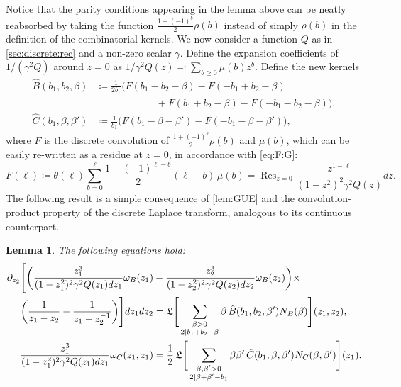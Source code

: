 \documentclass[a4paper,11pt,english]{article}
\theoremstyle{plain}
\newtheorem{lemma}[theorem]{Lemma}
\theoremstyle{definition}
\theoremstyle{plain}
\newcommand{\de}{\partial}
\DeclareMathOperator*{\Res}{Res}
\begin{document}
Notice that the parity conditions appearing in the lemma above can be neatly reabsorbed by taking the function $\frac{1+(-1)^{b}}{2} \rho(b)$ instead of simply $\rho(b)$ in the definition of the combinatorial kernels. We now consider a function $Q$ as in \cref{sec:discrete:rec} and a non-zero scalar $\gamma$. Define the expansion coefficients of $1/(\gamma^2 Q)$ around $z = 0$ as $1/\gamma^2 Q(z) \eqqcolon \sum_{b \ge 0} \mu(b) z^b$. Define the new kernels
\begin{equation}
\begin{split}
	\hat{B}(b_1,b_2,\beta)
	&\coloneqq
    \frac{1}{2b_1}
	\bigl(
		F(b_1 - b_2 - \beta) - F(-b_1 + b_2 - \beta) \\
		&\qquad\qquad\qquad
		+ F(b_1 + b_2 - \beta) - F(-b_1 -b_2 - \beta)
	\bigr), \\
	\hat{C}(b_1,\beta,\beta')
	&\coloneqq
    \frac{1}{b_1}
	\bigl(
		F(b_1 - \beta - \beta') - F(-b_1 - \beta - \beta')
	\bigr),
\end{split}
\end{equation}
where $F$ is the discrete convolution of $\frac{1+(-1)^{b}}{2} \rho(b)$ and $\mu(b)$, which can be easily re-written as a residue at $z = 0$, in accordance with \cref{eq:F:G}:
\begin{equation}
	F(\ell)
	\coloneqq
    \theta(\ell)
	\sum_{b = 0}^{\ell} \frac{1 + (-1)^{\ell - b}}{2} (\ell - b) \, \mu(b)
    =
    \Res_{z = 0} \frac{z^{1-\ell}}{(1 - z^2)^2 \gamma^2 Q(z)} dz.
\end{equation}
The following result is a simple consequence of \cref{lem:GUE} and the convolution-product property of the discrete Laplace transform, analogous to its continuous counterpart.

\begin{lemma}\label{lem:conv}
	The following equations hold:
	\begin{align}
		\notag
		\de_{z_2}
		\Bigg[
			\bigg(
				\frac{z_1^3}{(1 - z_1^2)^2 \gamma^2 Q(z_1) dz_1} \omega_B(z_1)
				&-
				\frac{z_2^3}{(1 - z_2^2)^2 \gamma^2 Q(z_2) dz_2} \omega_B(z_2)
			\bigg) \times
            \\
			\bigg(
				\frac{1}{z_1 - z_2}
				-
				\frac{1}{z_1 - z_2^{-1}}
			\bigg)
		\Bigg] dz_1 dz_2
		&=
		\mathfrak{L}\Bigg[
			\sum_{\substack{\beta > 0 \\ 2 \mid b_1 + b_2 - \beta}} \beta \, \hat{B}(b_1,b_2,\beta') N_B(\beta) 
		\Bigg](z_1,z_2),
		\\
		\frac{z_1^3}{(1-z_1^2)^2 \gamma^2 Q(z_1) dz_1} \omega_C(z_1,z_1)
		&=
		\frac{1}{2} \,
		\mathfrak{L}\Bigg[
			\sum_{\substack{\beta,\beta' > 0 \\ 2 \mid \beta + \beta' - b_1}} \beta \beta' \, \hat{C}(b_1,\beta,\beta') N_C(\beta,\beta') 
		\Bigg](z_1).
	\end{align}
\end{lemma}
\end{document}
